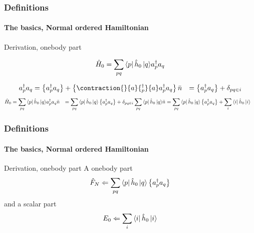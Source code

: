 \begin{frame}[fragile]
    \frametitle{Definitions}
    \framesubtitle{The basics, Normal ordered Hamiltonian}

    \small
    \begin{block}{Derivation, onebody part}
    
    \begin{equation*}
        \hat{H}_0 = \sum_{pq} \bra{p}\hat{h}_0\,|{q}\rangle a^\dagger_p a_q
    \end{equation*}

    \begin{align*}
        a^\dagger_p a_q &= \left\{a^\dagger_p a_q\right\} + \left\{ 
    \contraction{}{a}{{}^{\dagger}_p}{a}
    a^\dagger_p a_q
    \right\} \nn
        &= \left\{a^\dagger_p a_q\right\} + \delta_{pq\in i}
    \end{align*}
    \begin{align*}
        \hat{H}_0 &= \sum_{pq} \bra{p}\hat{h}_0\,|{q}\rangle a^\dagger_p a_q \bar{n}
            &= \sum_{pq} \bra{p}\hat{h}_0\,|{q}\rangle \left\{a^\dagger_p a_q\right\} + 
                \delta_{pq\in i} \sum_{pq} \bra{p}\hat{h}_0\,|{q}\rangle \bar{n}
            &= \sum_{pq} \bra{p}\hat{h}_0\,|{q}\rangle \left\{a^\dagger_p a_q\right\} +
                \sum_i \bra{i}\hat{h}_0\,|{i}\rangle
    \end{align*}



    \end{block}
\end{frame}

\begin{frame}[fragile]
    \frametitle{Definitions}
    \framesubtitle{The basics, Normal ordered Hamiltonian}

    \begin{block}{Derivation, onebody part}
    A onebody part
    \begin{equation*}
            \hat{F}_N \Leftarrow \sum_{pq} \bra{p}\hat{h}_0\,|{q}\rangle \left\{a^\dagger_p a_q\right\}
    \end{equation*}
    and a scalar part
    \begin{equation*}
                E_0 \Leftarrow \sum_i \bra{i}\hat{h}_0\,|{i}\rangle
    \end{equation*}



    \end{block}
\end{frame}

